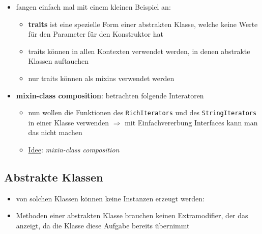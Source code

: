 \begin{itemize}
  \item fangen einfach mal mit einem kleinen Beispiel an:
  
  
  
  \begin{itemize}
    \item \textbf{traits} ist eine spezielle Form einer abstrakten Klasse, welche
    keine Werte für den Parameter für den Konstruktor hat
    \item traits können in allen Kontexten verwendet werden, in denen abstrakte
    Klassen auftauchen
    \item nur traits können als mixins verwendet werden
  \end{itemize}
  
  \item \textbf{mixin-class composition}: betrachten folgende Interatoren
  
  
  
  \begin{itemize}
    \item nun wollen die Funktionen des \texttt{RichIterators} und des
    \texttt{StringIterators} in einer Klasse verwenden $\Rightarrow$ mit
    Einfachvererbung \und Interfaces kann man das nicht machen
    \item \uline{Idee}: \textit{mixin-class composition}
    
    
    
  \end{itemize}
\end{itemize}


\subsection{Abstrakte Klassen}
\begin{itemize}
  \item von solchen Klassen können keine Instanzen erzeugt werden:
  
  
  
  \item Methoden einer abstrakten Klasse brauchen keinen Extramodifier, der
  das anzeigt, da die Klasse diese Aufgabe bereits übernimmt
\end{itemize}


